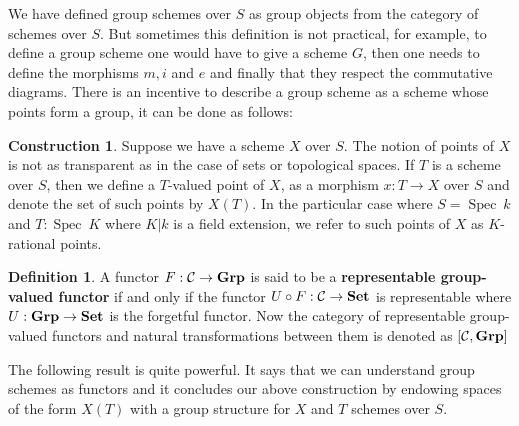 \documentclass{article}
\theoremstyle{plain}
\theoremstyle{definition}
\newtheorem{definition}[theorem]{Definition}
\newtheorem{construction}[theorem]{Construction}
\DeclareMathOperator{\Spec}{Spec}
\DeclareMathOperator{\SET}{\bf{Set}}
\DeclareMathOperator{\Grp}{\bf{Grp}}
\begin{document}
\noindent We have defined group schemes over $S$ as group objects from the category of schemes over $S$. 
But sometimes this definition is not practical, for example, to define a group scheme one would have to give a scheme $G$, then one needs to define the morphisms $m,i$ and $e$ and finally that they respect the commutative diagrams.
There is an incentive to describe a group scheme as a scheme whose points form a group, it can be done as follows:


\begin{construction}
Suppose we have a scheme $X$ over $S$. 
The notion of points of $X$ is not as transparent as in the case of sets or topological spaces.
If $T$ is a scheme over $S$, then we define a $T$-valued point of $X$, as a morphism $x : T\rightarrow X$ over $S$ and denote the set of such points by $X(T)$. 
In the particular case where $S = \Spec\: k$ and $T : \Spec\:K$ where $K|k$ is a field extension, we refer to such points of $X$ as $K$-rational points.
\end{construction}


\begin{definition}
    A functor $F:\mathcal{C}\rightarrow \Grp$ is said to be a \textbf{representable group-valued functor} if and only if the functor $U\circ F :\mathcal{C}\rightarrow \SET$ is representable where $U:\Grp \rightarrow \SET$ is the forgetful functor.
    Now the category of representable group-valued functors and natural transformations between them is denoted as $[\mathcal{C}, \Grp]$
\end{definition}

\noindent The following result is quite powerful. 
It says that we can understand group schemes as functors and it concludes our above construction by endowing spaces of the form $X(T)$ with a group structure for $X$ and $T$ schemes over $S$.
\end{document}
